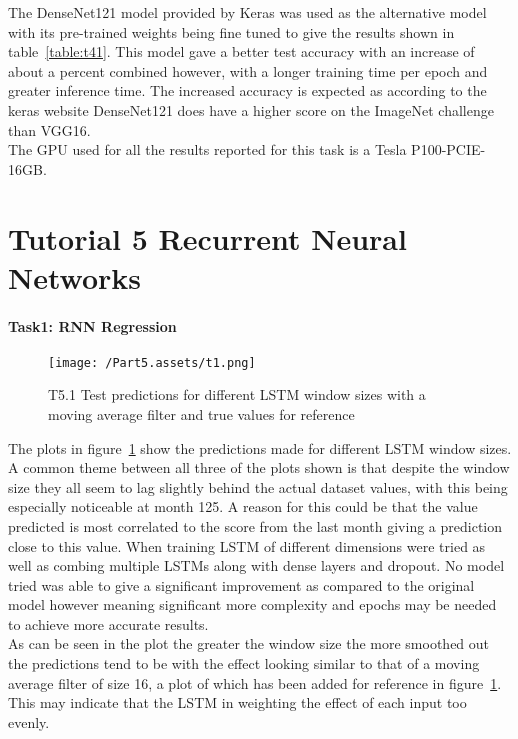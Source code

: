 \documentclass[10pt,twocolumn,letterpaper]{article}
\begin{document}
The DenseNet121 model provided by Keras was used as the alternative model with its pre-trained weights being fine tuned to give the results shown in table~\ref{table:t41}. This model gave a better test accuracy with an increase of about a percent combined however, with a longer training time per epoch and greater inference time. The increased accuracy is expected as according to the keras website\cite{pretrained} DenseNet121 does have a higher score on the ImageNet challenge than VGG16. 
\\ The GPU used for all the results reported for this task is a Tesla P100-PCIE-16GB.

\section{Tutorial 5 Recurrent Neural Networks}

\paragraph{Task1: RNN Regression}
\begin{figure}[ht]
    \begin{center}
        \texttt{[image: /Part5.assets/t1.png]}
        \caption{T5.1 Test predictions for different LSTM window sizes with a moving average filter and true values for reference}\label{fig:t51}
        \vspace{-0.7cm}
    \end{center}
\end{figure}
The plots in figure~\ref{fig:t51} show the predictions made for different LSTM window sizes. A common theme between all three of the plots shown is that despite the window size they all seem to lag slightly behind the actual dataset values, with this being especially noticeable at month 125. A reason for this could be that the value predicted is most correlated to the score from the last month giving a prediction close to this value. When training LSTM of different dimensions were tried as well as combing multiple LSTMs along with dense layers and dropout. No model tried was able to give a significant improvement as compared to the original model however meaning significant more complexity and epochs may be needed to achieve more accurate results.\\
As can be seen in the plot the greater the window size the more smoothed out the predictions tend to be with the effect looking similar to that of a moving average filter of size 16, a plot of which has been added for reference in figure~\ref{fig:t51}. This may indicate that the LSTM in weighting the effect of each input too evenly. 
\vspace{-0.5cm}
\end{document}
